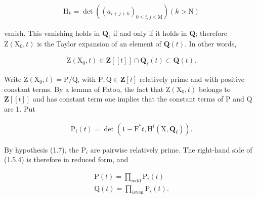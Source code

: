 \documentclass[10pt,leqno]{article}
\begin{document}
\begin{equation*}\begin{gathered}\mathrm{H}_{k} = \operatorname{det}((a_{i+j+k})_{0\leq i,j\leq \mathrm{M}})    (k>\mathrm{N})\end{gathered}\end{equation*}

\noindent vanish. This vanishing holds in \(\mathbf{Q}_{\ell }\) if and only if it holds in \(\mathbf{Q}\); therefore \(\mathrm{Z}(\mathrm{X}_{0},t)\) is the Taylor expansion of an element of \(\mathbf{Q}(t)\). In other words,\par

\begin{equation*}\begin{gathered}\mathrm{Z}(\mathrm{X}_{0},t) \in  \mathbf{Z}[[t]] \cap  \mathbf{Q}_{\ell }(t) \subset  \mathbf{Q}(t).\end{gathered}\end{equation*}

\noindent Write \(\mathrm{Z}(\mathrm{X}_{0},t)=\mathrm{P}/\mathrm{Q}\), with \(\mathrm{P},\mathrm{Q}\in \mathbf{Z}[t]\) relatively prime and with positive constant terms. By a lemma of Fatou, the fact that \(\mathrm{Z}(\mathrm{X}_{0},t)\) belongs to \(\mathbf{Z}[[t]]\) and has constant term one implies that the constant terms of \(\mathrm{P}\) and \(\mathrm{Q}\) are 1. Put\par

\begin{equation*}\begin{gathered}\mathrm{P}_{i}(t)=\operatorname{det}(1- \mathrm{F}^{*}t,\mathrm{H}^{i}(\mathrm{X},\mathbf{Q}_{\ell })).\end{gathered}\end{equation*}

\clearpage

\label{physical-6}\par\smallskip

\noindent By hypothesis (1.7), the \(\mathrm{P}_{i}\) are pairwise relatively prime. The right-hand side of (1.5.4) is therefore in reduced form, and\par

\begin{equation*}\begin{gathered}\mathrm{P}(t) = \prod _{i \text{odd}} \mathrm{P}_{i}(t) \\ \mathrm{Q}(t) = \prod _{i \text{even}} \mathrm{P}_{i}(t).\end{gathered}\end{equation*}
\end{document}
